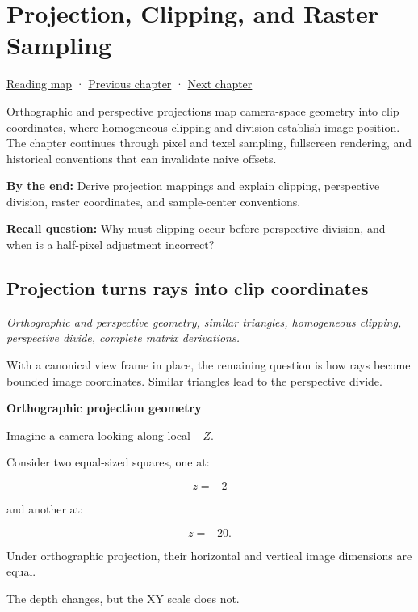 \hypertarget{02-foundations-ii-ch033}{}
\chapter{Projection, Clipping, and Raster Sampling}\label{02-foundations-ii-ch033-projection-clipping-and-raster-sampling}

\hyperref[volume-reading-map]{Reading map} · \hyperref[02-foundations-ii-ch032-geometry-becomes-an-image-and-an-inverse-problem]{Previous chapter} · \hyperref[02-foundations-ii-ch034-robust-predicates-and-camera-sensitivity]{Next chapter}

Orthographic and perspective projections map camera-space geometry into clip coordinates, where homogeneous clipping and division establish image position. The chapter continues through pixel and texel sampling, fullscreen rendering, and historical conventions that can invalidate naive offsets.

\textbf{By the end:} Derive projection mappings and explain clipping, perspective division, raster coordinates, and sample-center conventions.

\textbf{Recall question:} Why must clipping occur before perspective division, and when is a half-pixel adjustment incorrect?

\section{Projection turns rays into clip coordinates}\label{02-foundations-ii-ch033-projection-turns-rays-into-clip-coordinates}

\emph{Orthographic and perspective geometry, similar triangles, homogeneous clipping, perspective divide, complete matrix derivations.}

With a canonical view frame in place, the remaining question is how rays become bounded image coordinates. Similar triangles lead to the perspective divide.

\textbf{Orthographic projection geometry}

Imagine a camera looking along local \(-Z\).

Consider two equal-sized squares, one at:

\[
 z=-2
\]

and another at:

\[
 z=-20.
\]

Under orthographic projection, their horizontal and vertical image dimensions are equal.

The depth changes, but the XY scale does not.

